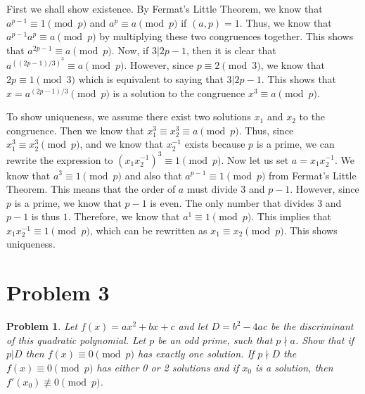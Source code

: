 \documentclass[psamsfonts]{amsart}
\newtheorem{prob}{Problem}[section]
\newenvironment{sol}{{\bfseries Solution}}{\qedsymbol}
\theoremstyle{definition}
\theoremstyle{remark}
\numberwithin{equation}{section}
\begin{document}
\begin{sol}
First we shall show existence. By Fermat's Little Theorem, we know that $a^{p-1} \equiv 1 \pmod{p}$ and $a^p \equiv a \pmod{p}$ if $(a,p) = 1$. Thus, we know that $a^{p-1} a^{p} \equiv a \pmod{p}$ by multiplying these two congruences together. This shows that $a^{2p - 1} \equiv a \pmod{p}$. Now, if $3 | 2p - 1$, then it is clear that $a^{((2p-1)/3)^3} \equiv a \pmod{p}$. However, since $p \equiv 2 \pmod{3}$, we know that $2p \equiv 1 \pmod{3}$ which is equivalent to saying that $3 | 2p-1$. This shows that $x = a^{(2p-1)/3} \pmod{p}$ is a solution to the congruence $x^3 \equiv a \pmod{p}$. 

To show uniqueness, we assume there exist two solutions $x_1$ and $x_2$ to the congruence. Then we know that $x_1^3 \equiv x_2^3 \equiv a \pmod{p}$. Thus, since $x_1^3 \equiv x_2^3 \pmod{p}$, and we know that $x_2^{-1}$ exists because $p$ is a prime, we can rewrite the expression to $(x_1 x_2^{-1})^3 \equiv 1 \pmod{p}$. Now let us set $a = x_1 x_2^{-1}$. We know that $a^3 \equiv 1 \pmod{p}$ and also that $a^{p-1} \equiv 1 \pmod{p}$ from Fermat's Little Theorem. This means that the order of $a$ must divide $3$ and $p-1$. However, since $p$ is a prime, we know that $p-1$ is even. The only number that divides $3$ and $p-1$ is thus $1$. Therefore, we know that $a^1 \equiv 1 \pmod{p}$. This implies that $x_1 x_2^{-1} \equiv 1 \pmod{p}$, which can be rewritten as $x_1 \equiv x_2 \pmod{p}$. This shows uniqueness.
\end{sol}

\section{Problem 3}

\begin{prob}
Let $f(x) = ax^2 + bx + c$ and let $D = b^2 - 4ac$ be the discriminant of this quadratic polynomial. Let $p$ be an odd prime, such that $p \nmid a$. Show that if $p | D$ then $f(x) \equiv 0 \pmod{p}$ has exactly one solution. If $p \nmid D$ the $f(x) \equiv 0 \pmod{p}$ has either 0 or 2 solutions and if $x_0$ is a solution, then $f'(x_0) \not \equiv 0 \pmod{p}$. 
\end{prob}
\end{document}
